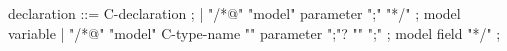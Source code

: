 \begin{syntax}
  declaration ::= C-declaration ;
  | {"/*@" "model" parameter ";" "*/"} ; model variable
  | "/*@" "model" C-type-name "{" parameter ";"? "}" ";" ; model field 
    "*/" ;
\end{syntax}

